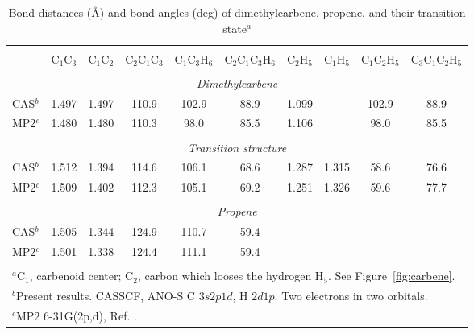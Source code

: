 \begin{table}[ht]
\caption{\label{tab:tsgeo}Bond distances (\AA) and bond angles (deg) of
dimethylcarbene, propene, and their transition state$^{a}$}
\begin{tabular}{lccccccccc} 
\\\hline\hline
\\
 & C$_1$C$_3$ & C$_1$C$_2$ & C$_2$C$_1$C$_3$ & C$_1$C$_3$H$_6$ & C$_2$C$_1$C$_3$H$_6$ & C$_2$H$_5$ & C$_1$H$_5$ & C$_1$C$_2$H$_5$ & C$_3$C$_1$C$_2$H$_5$ \\\hline
\\
\multicolumn{10}{c}{\it Dimethylcarbene} \\
CAS$^b$  & 1.497 & 1.497 & 110.9 & 102.9 & 88.9 & 1.099 &       & 102.9 &  88.9 \\
MP2$^c$  & 1.480 & 1.480 & 110.3 &  98.0 & 85.5 & 1.106 &       &  98.0 &  85.5 \\
\\
\multicolumn{10}{c}{\it Transition structure}                                   \\
CAS$^b$  & 1.512 & 1.394 & 114.6 & 106.1 & 68.6 & 1.287 & 1.315 &  58.6 &  76.6 \\
MP2$^c$  & 1.509 & 1.402 & 112.3 & 105.1 & 69.2 & 1.251 & 1.326 &  59.6 &  77.7 \\
\\
\multicolumn{10}{c}{\it Propene}                                                \\
CAS$^b$  & 1.505 & 1.344 & 124.9 & 110.7 & 59.4 &       &       &       &       \\
MP2$^c$  & 1.501 & 1.338 & 124.4 & 111.1 & 59.4 &       &       &       &       \\
\\\hline\hline
\multicolumn{10}{l}{\footnotesize{$^a$C$_1$, carbenoid center; C$_2$, carbon which looses the hydrogen H$_5$. See Figure~\ref{fig:carbene}.}}\\
\multicolumn{10}{l}{\footnotesize{$^b$Present results. CASSCF, ANO-S C $3s2p1d$, H $2d1p$. Two electrons in two orbitals.}}\\
\multicolumn{10}{l}{\footnotesize{$^c$MP2 6-31G(2p,d), Ref. \cite{Ford:97}.}}\\
\end{tabular}
\end{table}


